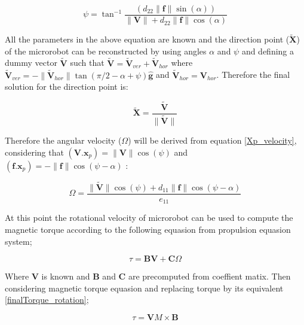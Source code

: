 \documentclass[12pt,a4paper,titlepage]{report}
\begin{document}
\begin{equation}
  {\psi} ={{\tan}^{-1}} 
\frac{\left( d_{22} {\| \bm{f} \|} \sin(\alpha) \right)}{ \| {\bm{V} \| + d_{22} \| {\bm{f}} \|} \cos(\alpha) }
\label{psi}  
\end{equation}


All the parameters in the above equation are known and the direction point ($\tilde{\bm{X}}$) of the microrobot
 can be reconstructed by using angles $\alpha$ and $\psi$ and defining a dummy vector $\tilde{\bm{V}}$ such
that $\tilde{\bm{V}} = {\tilde{\bm{V}}}_{ver} + {\tilde{\bm{V}}}_{hor} $ where 
${\tilde{\bm{V}}}_{ver} = - \| {\tilde{\bm{V}}}_{hor} \| \tan(\pi /2 - \alpha + \psi) \hat{\bm{g}}$ and 
${\tilde{\bm{V}}}_{hor}  = {{\bm{V}}}_{hor}$. Therefore the final solution for the direction point is:



\begin{equation}
 \tilde{\bm{X} }  = \frac{\tilde{\bm{V}}}{\| {\tilde{\bm{V}}} \|}
\label{direction_point}  
\end{equation}

Therefore the angular velocity ($\Omega$) will be derived from equation \ref{Xp_velocity}, considering that
$(\bm{V} . \bm{x}_p) = \| {\bm{V}} \|  \cos({\psi})$ and $({\bm{f} . {\bm{x}}_p  }) = - \| {\bm{f}} \| \cos(\psi - \alpha) $ :




\begin{equation}
 \Omega  = \frac{\| {\tilde{\bm{V}} \|  \cos(\psi) }   + d_{11}  \| \bm{f} \| \cos(\psi - \alpha)}{e_{11}}
\label{FinalAngular_velo}  
\end{equation}

At this point the rotational velocity of microrobot can be used to compute the magnetic torque according to
the following equasion from propulsion equasion system;


\begin{equation}
 \tau = \bm{B} \bm{V} + \bm{C} \Omega 
\label{finalTorque_rotation}  
\end{equation}

Where $\bm{V}$ is known and $\bm{B}$ and $\bm{C}$ are precomputed from coeffient matix. Then considering
  magnetic torque equasion and replacing torque by its equivalent \ref{finalTorque_rotation};

\begin{equation}
 \tau = \bm{V}M \times \bm{B}
\label{finding-B}  
\end{equation}
\end{document}
